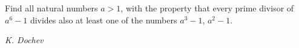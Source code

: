 Find all natural numbers $a>1$, with the property that every prime divisor of $a^6-1$ divides also at least one of the numbers $a^3-1$, $a^2-1$.

\textit{K. Dochev}